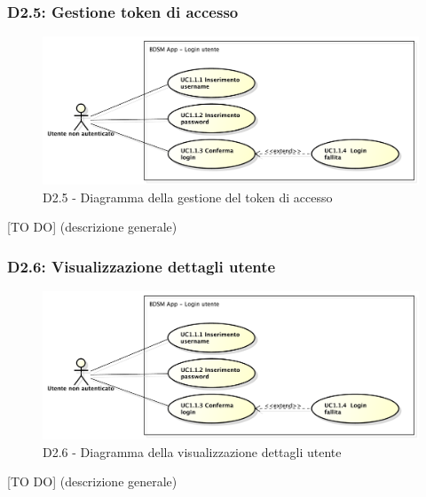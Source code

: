 		\subsubsection{D2.5: Gestione token di accesso} %
		\label{ssub:gestione_token_di_accesso}
		\begin{figure}[!htbp]
			\centering
			\centerline{\includegraphics[scale=0.45]{./images/UC1_1.pdf}}
			\caption{D2.5 - Diagramma della gestione del token di accesso}
		\end{figure}
		[TO DO] (descrizione generale)

		\subsubsection{D2.6: Visualizzazione dettagli utente} %
		\label{ssub:visualizzazione_dettagli_utente}
		\begin{figure}[!htbp]
			\centering
			\centerline{\includegraphics[scale=0.45]{./images/UC1_1.pdf}}
			\caption{D2.6 - Diagramma della visualizzazione dettagli utente}
		\end{figure}
		[TO DO] (descrizione generale)

